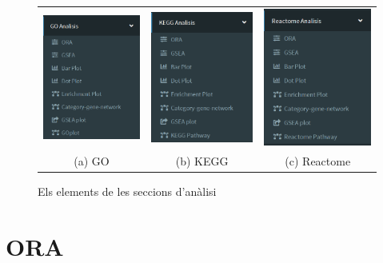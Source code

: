 \begin{figure}[H]
\centering
\begin{tabular}{ccc}
\includegraphics[width=45mm]{figures/App_F2_Items_GO.png} & 
\includegraphics[width=45mm]{figures/App_F3_Items_KEGG.png} &
\includegraphics[width=45mm]{figures/App_F4_Items_RA.png} \\
(a) GO & (b) KEGG & (c) Reactome \\
\end{tabular}
\caption{Els elements de les seccions d'anàlisi}
\end{figure}


\label{sec:ACom}

\section{ORA}

